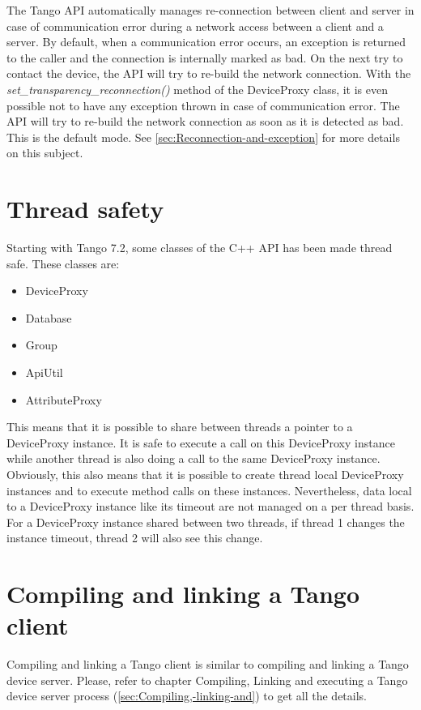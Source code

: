 The Tango API automatically manages re-connection between client and
server in case of communication error during a network access between
a client and a server. By default, when a communication error occurs,
an exception is returned to the caller and the connection is internally
marked as bad. On the next try to contact the device, the API will
try to re-build the network connection. With the \emph{set\_transparency\_reconnection()}
method of the DeviceProxy class, it is even possible
not to have any exception thrown in case of communication error. The
API will try to re-build the network connection as soon as it is detected
as bad. This is the default mode. See \ref{sec:Reconnection-and-exception}
for more details on this subject.

\section{Thread safety}

Starting with Tango 7.2, some classes of the C++ API has been made
thread safe. These classes are:
\begin{itemize}
\item DeviceProxy
\item Database
\item Group
\item ApiUtil
\item AttributeProxy
\end{itemize}
This means that it is possible to share between threads a pointer
to a DeviceProxy instance. It is safe to execute a call on this DeviceProxy
instance while another thread is also doing a call to the same DeviceProxy
instance. Obviously, this also means that it is possible to create
thread local DeviceProxy instances and to execute method calls on
these instances. Nevertheless, data local to a DeviceProxy instance
like its timeout are not managed on a per thread basis. For a DeviceProxy
instance shared between two threads, if thread 1 changes the instance
timeout, thread 2 will also see this change.

\section{Compiling and linking a Tango client}

Compiling and linking a Tango client is similar to compiling and linking
a Tango device server. Please, refer to chapter \textquotedbl{}Compiling,
Linking and executing a Tango device server process\textquotedbl{}
(\ref{sec:Compiling,-linking-and}) to get all the details.


